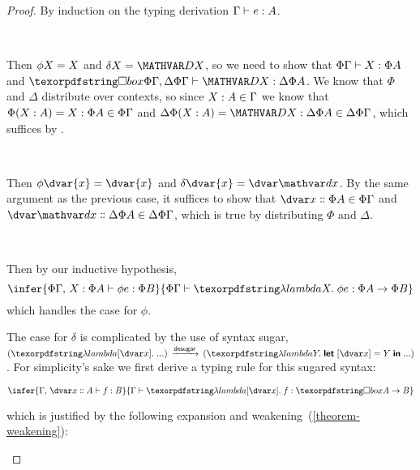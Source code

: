 \begin{proof}\label{proof-phi-delta-well-typed}
  By induction on the typing derivation ${\Gamma} \vdash {e} \mathrel{:} {A}$.

  \begin{description}[topsep=1em,itemsep=1em]
    \item[Case\quad $\infer{\hm x A \in \G}{\J {\mvar x} \G A}$,\quad $\phi\mvar{x} =
      \mvar{x}$,\quad $\delta\mvar{x} = \mvar\dx$.]\

      Then $\phi \mvar x = \mvar{x}$ and $\delta\mvar x = \mvar\dx$, so we
      need to show that $\J{\mvar{x}}{\Phi\Gamma}{\Phi A}$ and
      $\J{\mvar\dx}{\iso\Phi\Gamma, \Delta\Phi\Gamma}{\Delta\Phi A}$. We know
      that $\Phi$ and $\Delta$ distribute over contexts, so since $\hm x A \in
      \Gamma$ we know that $\Phi(\hm x A) = \hm x {\Phi A} \in \Phi\Gamma$ and
      $\Delta\Phi(\hm x A) = \hm{\dx}{\Delta\Phi A} \in \Delta\Phi\Gamma$, which
      suffices by .

    \item[Case\quad $\infer{\hd x A \in \G}{\J {\dvar x} \G A}$,\quad
      $\phi\dvar{x} = \dvar{x}$,\quad $\delta\dvar{x} = \dvar\dx$.]\

      Then $\phi\dvar{x} = \dvar{x}$ and $\delta\dvar{x} = \dvar\dx$. By the
      same argument as the previous case, it suffices to show that $\hd{x}{\Phi
        A} \in \Phi\Gamma$ and $\hd{\dx}{\Delta\Phi A} \in \Delta\Phi\Gamma$,
      which is true by distributing $\Phi$ and $\Delta$.

    \item[Case\quad $\infer{\J e {\G,\,\hm x A} B}{\J {\efn x e} \G {A \to B}}$,\quad
      $\phi(\efn x e) = \efn x \phi e$,\quad
      $\delta(\efn x e) = \fnof{\pboxvar x}\efn\dx \delta e$.]\

      Then by our inductive hypothesis,
      \[
      \infer{
        \J{\phi e}{\Phi\Gamma,\, \hm x {\Phi A}}{\Phi B}
      }{\J{\efn x \phi e}{\Phi\Gamma}{\Phi A \to \Phi B}}
      \]
      which handles the case for $\phi$.

      The case for $\delta$ is complicated by the use of syntax sugar,
      $(\fnof{\pboxvar x} ...) \desugars (\efn y \eletbox x {\mvar y} ...)$. For
      simplicity's sake we first derive a typing rule for this sugared syntax:

      \[
      \infer{
        \J{f}{\Gamma,\, \hd x A}{B}
      }{
        \J{\fnof{\pboxvar x} f}{\Gamma}{\iso A \to B}
      }
      \]

      \noindent
      which is justified by the following expansion and
      weakening~(\cref{theorem-weakening}):


\end{description}
\end{proof}
